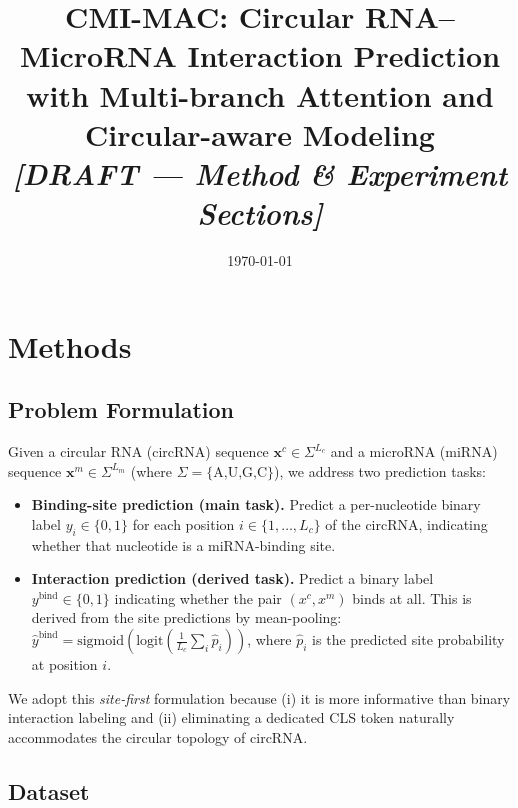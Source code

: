 \documentclass[11pt]{article}
\title{CMI-MAC: Circular RNA--MicroRNA Interaction Prediction\\
       with Multi-branch Attention and Circular-aware Modeling\\[4pt]
       \large \textit{[DRAFT --- Method \& Experiment Sections]}}
\date{\today}
\begin{document}
\maketitle
\tableofcontents
\newpage

\section{Methods}

\subsection{Problem Formulation}

Given a circular RNA (circRNA) sequence $\mathbf{x}^c \in \Sigma^{L_c}$
and a microRNA (miRNA) sequence $\mathbf{x}^m \in \Sigma^{L_m}$
(where $\Sigma = \{\text{A,U,G,C}\}$),
we address two prediction tasks:

\begin{itemize}[leftmargin=*]
  \item \textbf{Binding-site prediction (main task).}
        Predict a per-nucleotide binary label $y_i \in \{0,1\}$ for each
        position $i \in \{1,\ldots,L_c\}$ of the circRNA, indicating whether
        that nucleotide is a miRNA-binding site.
  \item \textbf{Interaction prediction (derived task).}
        Predict a binary label $y^{\text{bind}} \in \{0,1\}$ indicating
        whether the pair $(x^c, x^m)$ binds at all.
        This is derived from the site predictions by mean-pooling:
        $\hat{y}^{\text{bind}} = \text{sigmoid}\!\left(
          \text{logit}\!\left(\frac{1}{L_c}\sum_i \hat{p}_i\right)\right)$,
        where $\hat{p}_i$ is the predicted site probability at position $i$.
\end{itemize}

\noindent
We adopt this \textit{site-first} formulation because (i) it is more
informative than binary interaction labeling and (ii) eliminating a dedicated
CLS token naturally accommodates the circular topology of circRNA.


\subsection{Dataset}
\end{document}
